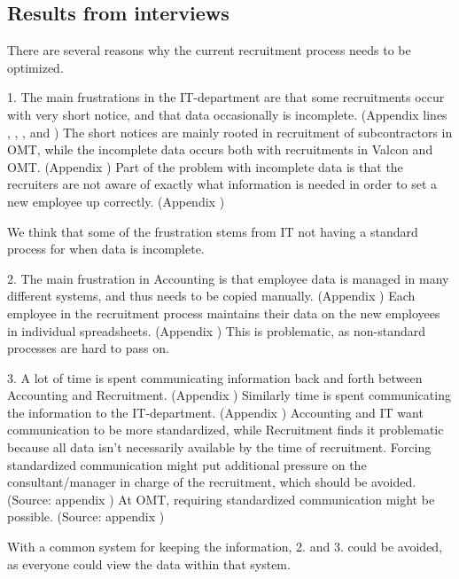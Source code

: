 \subsection{Results from interviews}
There are several reasons why the current recruitment process needs to be optimized.

1. The main frustrations in the IT-department are that some recruitments occur with very short notice, and that data occasionally is incomplete.
(Appendix  lines , , , and )
The short notices are mainly rooted in recruitment of subcontractors in OMT, while the incomplete data occurs both with recruitments in Valcon and OMT.
(Appendix )
Part of the problem with incomplete data is that the recruiters are not aware of exactly what information is needed in order to set a new employee up correctly.
(Appendix )

We think that some of the frustration stems from IT not having a standard process for when data is incomplete.

2. The main frustration in Accounting is that employee data is managed in many different systems, and thus needs to be copied manually.
(Appendix )
Each employee in the recruitment process maintains their data on the new employees in individual spreadsheets.
(Appendix )
This is problematic, as non-standard processes are hard to pass on.

3. A lot of time is spent communicating information back and forth between Accounting and Recruitment.
(Appendix )
Similarly time is spent communicating the information to the IT-department.
(Appendix )
Accounting and IT want communication to be more standardized, while Recruitment finds it problematic because all data isn't necessarily available by the time of recruitment.
Forcing standardized communication might put additional pressure on the consultant/manager in charge of the recruitment, which should be avoided.
(Source: appendix )
At OMT, requiring standardized communication might be possible.
(Source: appendix )

With a common system for keeping the information, 2. and 3. could be avoided, as everyone could view the data within that system.

